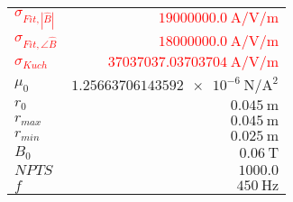 
{%
    \begin{center}
    \label{tab:fitparams:alu:freq:approx:high}
    \begin{tabular}{lr}
    \toprule
        \textcolor{red}{$\sigma_{Fit,|\hat{B}|}$} & \textcolor{red}{$\SI{19000000.0}{\ampere\per\volt\per\meter}$}\\
        \textcolor{red}{$\sigma_{Fit,\angle\hat{B}}$} & \textcolor{red}{$\SI{18000000.0}{\ampere\per\volt\per\meter}$}\\
        \textcolor{red}{$\sigma_{Kuch}$} & \textcolor{red}{$\SI{37037037.03703704}{\ampere\per\volt\per\meter}$}\\
        $\mu_0$ & $\SI{1.25663706143592e-6}{\newton\per\ampere\squared}$\\
        $r_0$ & $\SI{0.045}{\meter}$\\
        $r_{max}$ & $\SI{0.045}{\meter}$\\
        $r_{min}$ & $\SI{0.025}{\meter}$\\
        $B_0$ & $\SI{0.06}{\tesla}$\\
        $NPTS$ & $\num{1000.0}$\\
        $f$ & $\SI{450}{\hertz}$\\

    \bottomrule
    \end{tabular}
    \end{center}
}

